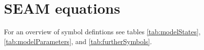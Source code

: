 \section{SEAM equations \label{app:SEAM}}    

For an overview of symbol defintions see tables \ref{tab:modelStates},
\ref{tab:modelParameters}, and \ref{tab:furtherSymbols}.

